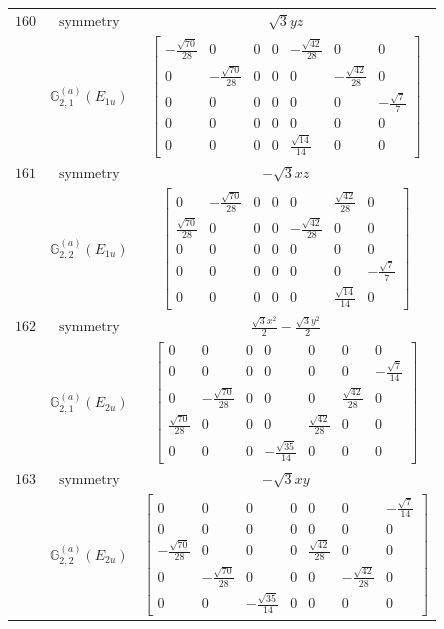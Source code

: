 \documentclass[fleqn,8pt,landscape]{jsarticle}
\begin{document}
\begin{longtable}{ccc}
$ 160 $ & $ \text{symmetry} $ & $ \sqrt{3} y z $ \\
$  $ & $ \mathbb{G}_{2,1}^{(a)}(E_{1u}) $ & $ \begin{bmatrix} - \frac{\sqrt{70}}{28} & 0 & 0 & 0 & - \frac{\sqrt{42}}{28} & 0 & 0 \\ 0 & - \frac{\sqrt{70}}{28} & 0 & 0 & 0 & - \frac{\sqrt{42}}{28} & 0 \\ 0 & 0 & 0 & 0 & 0 & 0 & - \frac{\sqrt{7}}{7} \\ 0 & 0 & 0 & 0 & 0 & 0 & 0 \\ 0 & 0 & 0 & 0 & \frac{\sqrt{14}}{14} & 0 & 0 \end{bmatrix} $ \\ \hline
$ 161 $ & $ \text{symmetry} $ & $ - \sqrt{3} x z $ \\
$  $ & $ \mathbb{G}_{2,2}^{(a)}(E_{1u}) $ & $ \begin{bmatrix} 0 & - \frac{\sqrt{70}}{28} & 0 & 0 & 0 & \frac{\sqrt{42}}{28} & 0 \\ \frac{\sqrt{70}}{28} & 0 & 0 & 0 & - \frac{\sqrt{42}}{28} & 0 & 0 \\ 0 & 0 & 0 & 0 & 0 & 0 & 0 \\ 0 & 0 & 0 & 0 & 0 & 0 & - \frac{\sqrt{7}}{7} \\ 0 & 0 & 0 & 0 & 0 & \frac{\sqrt{14}}{14} & 0 \end{bmatrix} $ \\ \hline
$ 162 $ & $ \text{symmetry} $ & $ \frac{\sqrt{3} x^{2}}{2} - \frac{\sqrt{3} y^{2}}{2} $ \\
$  $ & $ \mathbb{G}_{2,1}^{(a)}(E_{2u}) $ & $ \begin{bmatrix} 0 & 0 & 0 & 0 & 0 & 0 & 0 \\ 0 & 0 & 0 & 0 & 0 & 0 & - \frac{\sqrt{7}}{14} \\ 0 & - \frac{\sqrt{70}}{28} & 0 & 0 & 0 & \frac{\sqrt{42}}{28} & 0 \\ \frac{\sqrt{70}}{28} & 0 & 0 & 0 & \frac{\sqrt{42}}{28} & 0 & 0 \\ 0 & 0 & 0 & - \frac{\sqrt{35}}{14} & 0 & 0 & 0 \end{bmatrix} $ \\ \hline
$ 163 $ & $ \text{symmetry} $ & $ - \sqrt{3} x y $ \\
$  $ & $ \mathbb{G}_{2,2}^{(a)}(E_{2u}) $ & $ \begin{bmatrix} 0 & 0 & 0 & 0 & 0 & 0 & - \frac{\sqrt{7}}{14} \\ 0 & 0 & 0 & 0 & 0 & 0 & 0 \\ - \frac{\sqrt{70}}{28} & 0 & 0 & 0 & \frac{\sqrt{42}}{28} & 0 & 0 \\ 0 & - \frac{\sqrt{70}}{28} & 0 & 0 & 0 & - \frac{\sqrt{42}}{28} & 0 \\ 0 & 0 & - \frac{\sqrt{35}}{14} & 0 & 0 & 0 & 0 \end{bmatrix} $ \\ \hline

\end{longtable}
\end{document}
